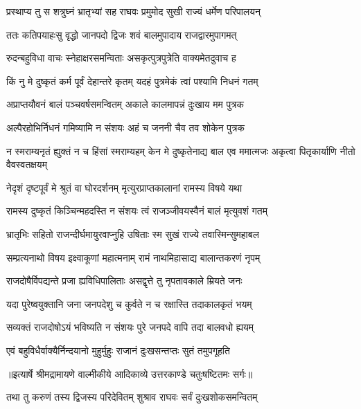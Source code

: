 \twolineshloka
{प्रस्थाप्य तु स शत्रुघ्नं भ्रातृभ्यां सह राघवः}
{प्रमुमोद सुखी राज्यं धर्मेण परिपालयन्} %

\twolineshloka
{ततः कतिपयाहःसु वृद्धो जानपदो द्विजः}
{शवं बालमुपादाय राजद्वारमुपागमत्} %

\twolineshloka
{रुदन्बहुविधा वाचः स्नेहाक्षरसमन्विताः}
{असकृत्पुत्रपुत्रेति वाक्यमेतदुवाच ह} %

\twolineshloka
{किं नु मे दुष्कृतं कर्म पूर्वं देहान्तरे कृतम्}
{यदहं पुत्रमेकं त्वां पश्यामि निधनं गतम्} %

\twolineshloka
{अप्राप्तयौवनं बालं पञ्चवर्षसमन्वितम्}
{अकाले कालमापन्नं दुःखाय मम पुत्रक} %

\twolineshloka
{अल्पैरहोभिर्निधनं गमिष्यामि न संशयः}
{अहं च जननी चैव तव शोकेन पुत्रक} %

\threelineshloka
{न स्मराम्यनृतं ह्युक्तं न च हिंसां स्मराम्यहम्}
{केन मे दुष्कृतेनाद्य बाल एव ममात्मजः}
{अकृत्वा पितृकार्याणि नीतो वैवस्वतक्षयम्} %

\twolineshloka
{नेदृशं दृष्टपूर्वं मे श्रुतं वा घोरदर्शनम्}
{मृत्युरप्राप्तकालानां रामस्य विषये यथा} %

\twolineshloka
{रामस्य दुष्कृतं किञ्चिन्महदस्ति न संशयः}
{त्वं राजञ्जीवयस्वैनं बालं मृत्युवशं गतम्} %

\twolineshloka
{भ्रातृभिः सहितो राजन्दीर्घमायुरवाप्नुहि}
{उषिताः स्म सुखं राज्ये तवास्मिन्सुमहाबल} %

\twolineshloka
{सम्प्रत्यनाथो विषय इक्ष्वाकूणां महात्मनाम्}
{रामं नाथमिहासाद्य बालान्तकरणं नृपम्} %

\twolineshloka
{राजदोषैर्विपद्यन्ते प्रजा ह्यविधिपालिताः}
{असद्वृत्ते तु नृपतावकाले म्रियते जनः} %

\twolineshloka
{यदा पुरेष्वयुक्तानि जना जनपदेशु च}
{कुर्वते न च रक्षास्ति तदाकालकृतं भयम्} %

\twolineshloka
{सव्यक्तं राजदोषोऽयं भविष्यति न संशयः}
{पुरे जनपदे वापि तदा बालवधो ह्ययम्} %

\twolineshloka
{एवं बहुविधैर्वाक्यैर्निन्दयानो मुहुर्मुहुः}
{राजानं दुःखसन्तप्तः सुतं तमुपगूहति} %


{॥इत्यार्षे श्रीमद्रामायणे वाल्मीकीये आदिकाव्ये उत्तरकाण्डे चतुःषष्टितमः सर्गः॥}


\twolineshloka
{तथा तु करुणं तस्य द्विजस्य परिदेवितम्}
{शुश्राव राघवः सर्वं दुःखशोकसमन्वितम्} %

